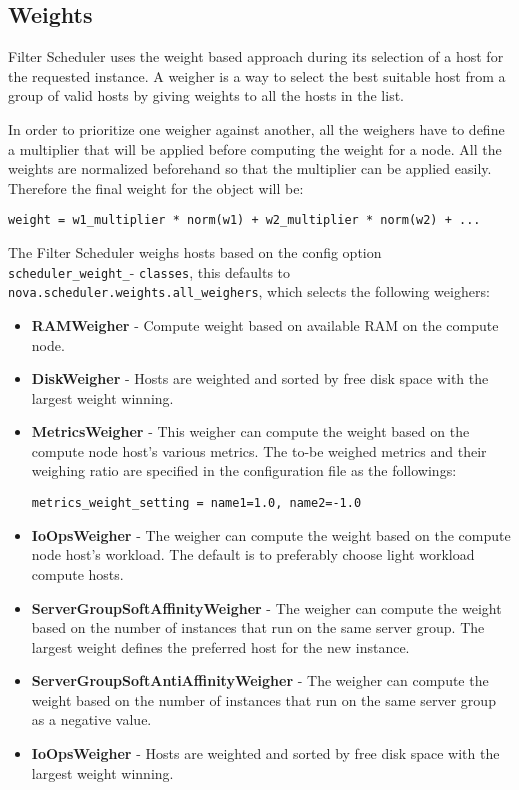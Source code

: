 \subsection{Weights}\label{ssec:novaweights}
Filter Scheduler uses the weight based approach during its selection of a host for the requested instance.
A weigher is a way to select the best suitable host from a group of valid hosts by giving weights to all the hosts in the list.

In order to prioritize one weigher against another, all the weighers have to define a multiplier that will be applied before computing the weight for a node. All the weights are normalized beforehand so that the multiplier can be applied easily. Therefore the final weight for the object will be:
\begin{lstlisting}[frame=single]
weight = w1_multiplier * norm(w1) + w2_multiplier * norm(w2) + ...
\end{lstlisting}

The Filter Scheduler weighs hosts based on the config option \verb|scheduler_weight_|- \verb|classes|, this defaults to \verb|nova.scheduler.weights.all_weighers|, which selects the following weighers:

\begin{itemize}
	\item \textbf{RAMWeigher} - Compute weight based on available RAM on the compute node.

	\item \textbf{DiskWeigher} - Hosts are weighted and sorted by free disk space with the largest weight winning.

	\item \textbf{MetricsWeigher} - This weigher can compute the weight based on the compute node host’s various metrics.
		The to-be weighed metrics and their weighing ratio are specified in the configuration file as the followings:
\begin{lstlisting}[frame=single]
metrics_weight_setting = name1=1.0, name2=-1.0
\end{lstlisting}

	\item \textbf{IoOpsWeigher} - The weigher can compute the weight based on the compute node host’s workload. The default is to preferably choose light workload compute hosts.

	\item \textbf{ServerGroupSoftAffinityWeigher} - The weigher can compute the weight based on the number of instances that run on the same server group.
		The largest weight defines the preferred host for the new instance.

	\item \textbf{ServerGroupSoftAntiAffinityWeigher} - The weigher can compute the weight based on the number of instances that run on the same server group as a negative value.

	\item \textbf{IoOpsWeigher} - Hosts are weighted and sorted by free disk space with the largest weight winning.
\end{itemize}

